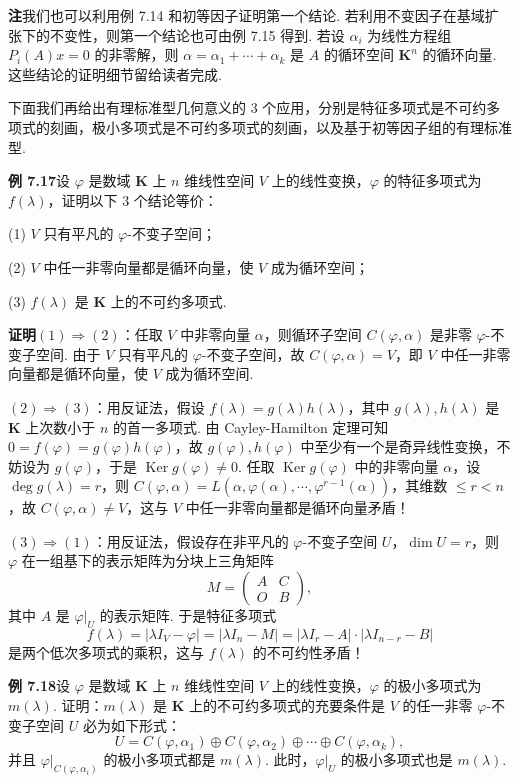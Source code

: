 \documentclass[UTF8,12pt,a4paper,fontset=fandol]{ctexart}
\begin{document}
\noindent\textbf{注}\quad 我们也可以利用例 7.14 和初等因子证明第一个结论. 若利用不变因子在基域扩张下的不变性，则第一个结论也可由例 7.15 得到. 若设 $\alpha_i$ 为线性方程组 $P_i(A)x=0$ 的非零解，则 $\alpha=\alpha_1+\cdots+\alpha_k$ 是 $A$ 的循环空间 $\mathbf{K}^n$ 的循环向量. 这些结论的证明细节留给读者完成.

下面我们再给出有理标准型几何意义的 3 个应用，分别是特征多项式是不可约多项式的刻画，极小多项式是不可约多项式的刻画，以及基于初等因子组的有理标准型.

\noindent\textbf{例 7.17}\quad 设 $\varphi$ 是数域 $\mathbf{K}$ 上 $n$ 维线性空间 $V$ 上的线性变换，$\varphi$ 的特征多项式为 $f(\lambda)$，证明以下 3 个结论等价：

(1) $V$ 只有平凡的 $\varphi$-不变子空间；

(2) $V$ 中任一非零向量都是循环向量，使 $V$ 成为循环空间；

(3) $f(\lambda)$ 是 $\mathbf{K}$ 上的不可约多项式.

\noindent\textbf{证明}\quad $(1)\Rightarrow(2)$：任取 $V$ 中非零向量 $\alpha$，则循环子空间 $C(\varphi,\alpha)$ 是非零 $\varphi$-不变子空间. 由于 $V$ 只有平凡的 $\varphi$-不变子空间，故 $C(\varphi,\alpha)=V$，即 $V$ 中任一非零向量都是循环向量，使 $V$ 成为循环空间.

$(2)\Rightarrow(3)$：用反证法，假设 $f(\lambda)=g(\lambda)h(\lambda)$，其中 $g(\lambda),h(\lambda)$ 是 $\mathbf{K}$ 上次数小于 $n$ 的首一多项式. 由 Cayley-Hamilton 定理可知 $0=f(\varphi)=g(\varphi)h(\varphi)$，故 $g(\varphi),h(\varphi)$ 中至少有一个是奇异线性变换，不妨设为 $g(\varphi)$，于是 $\operatorname{Ker}g(\varphi)\ne 0$. 任取 $\operatorname{Ker}g(\varphi)$ 中的非零向量 $\alpha$，设 $\deg g(\lambda)=r$，则 $C(\varphi,\alpha)=L(\alpha,\varphi(\alpha),\cdots,\varphi^{r-1}(\alpha))$，其维数 $\le r<n$，故 $C(\varphi,\alpha)\ne V$，这与 $V$ 中任一非零向量都是循环向量矛盾！

$(3)\Rightarrow(1)$：用反证法，假设存在非平凡的 $\varphi$-不变子空间 $U$，$\dim U=r$，则 $\varphi$ 在一组基下的表示矩阵为分块上三角矩阵
\[
M=\left(\begin{array}{cc}
A & C\\
O & B
\end{array}\right),
\]
其中 $A$ 是 $\varphi|_U$ 的表示矩阵. 于是特征多项式
\[
f(\lambda)=|\lambda I_V-\varphi|=|\lambda I_n-M|=|\lambda I_r-A|\cdot|\lambda I_{n-r}-B|
\]
是两个低次多项式的乘积，这与 $f(\lambda)$ 的不可约性矛盾！

\noindent\textbf{例 7.18}\quad 设 $\varphi$ 是数域 $\mathbf{K}$ 上 $n$ 维线性空间 $V$ 上的线性变换，$\varphi$ 的极小多项式为 $m(\lambda)$. 证明：$m(\lambda)$ 是 $\mathbf{K}$ 上的不可约多项式的充要条件是 $V$ 的任一非零 $\varphi$-不变子空间 $U$ 必为如下形式：
\[
U=C(\varphi,\alpha_1)\oplus C(\varphi,\alpha_2)\oplus\cdots\oplus C(\varphi,\alpha_k),
\]
并且 $\varphi|_{C(\varphi,\alpha_i)}$ 的极小多项式都是 $m(\lambda)$. 此时，$\varphi|_U$ 的极小多项式也是 $m(\lambda)$.
\end{document}
